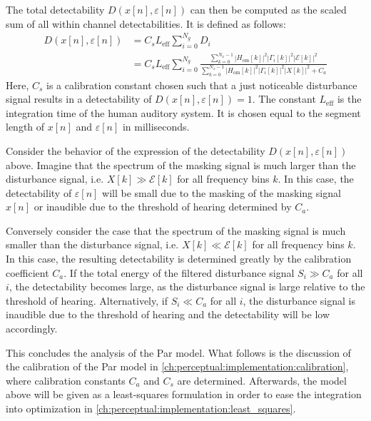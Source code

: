 The total detectability $D(x[n],\varepsilon[n])$ can then be computed as the scaled sum of all within channel detectabilities.
It is defined as follows:
\begin{align}
    D(x[n],\varepsilon[n]) &= C_s L_\text{eff}\sum_{i=0}^{N_g} D_i \\
                        &= C_s L_\text{eff}\sum_{i=0}^{N_g} 
                        \frac{\sum_{k=0}^{N_x-1}\left|H_\text{om}[k]\right|^2\left|
                            \Gamma_i[k]\right|^2\left|\mathcal{E}[k]\right|^2}
                        {\sum_{k=0}^{N_x-1}\left|H_\text{om}[k]\right|^2\left|
                            \Gamma_i[k]\right|^2\left|X[k]\right|^2 + C_a}
\end{align}
Here, $C_s$ is a calibration constant chosen such that a just noticeable disturbance signal results in a 
detectability of $D(x[n],\varepsilon[n]) = 1$. 
The constant $L_\text{eff}$ is the integration time of the human auditory system.
It is chosen equal to the segment length of $x[n]$ and $\varepsilon[n]$ in milliseconds.  

Consider the behavior of the expression of the detectability $D(x[n],\varepsilon[n])$ above.
Imagine that the spectrum of the masking signal is much larger than the disturbance signal, 
i.e. $X[k] \gg \mathcal{E}[k]$ for all frequency bins $k$.
In this case, the detectability of $\varepsilon[n]$ will be small due to the masking of the masking signal $x[n]$ or
inaudible due to the threshold of hearing determined by $C_a$.

Conversely consider the case that the spectrum of the masking signal is much smaller than the disturbance signal,
i.e. $X[k] \ll \mathcal{E}[k]$ for all frequency bins $k$.
In this case, the resulting detectability is determined greatly by the calibration coefficient $C_a$. 
If the total energy of the filtered disturbance signal $S_i \gg C_a$ for all $i$,
the detectability becomes large, as the disturbance signal is large relative to the threshold of hearing.
Alternatively, if $S_i \ll C_a$ for all $i$, the disturbance signal is inaudible due to the threshold of hearing and 
the detectability will be low accordingly.

This concludes the analysis of the Par model.
What follows is the discussion of the calibration of the Par model in \autoref{ch:perceptual:implementation:calibration},
where calibration constants $C_a$ and $C_s$ are determined.
Afterwards, the model above will be given as a least-squares formulation in order to ease the integration
into optimization in \autoref{ch:perceptual:implementation:least_squares}.

